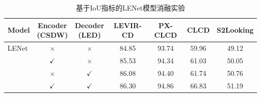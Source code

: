 \begin{table}[!htbp]
  \centering
  \caption{基于IoU指标的LENet模型消融实验}
  \label{tab:lenet_ablation}
  \begin{tabular}{lcccccc}
    \toprule
    Model & \makecell{Encoder\\(CSDW)} & \makecell{Decoder\\(LED)} & LEVIR-CD & PX-CLCD & CLCD  & S2Looking \\
    \midrule
    LENet               & $\times$      & $\times$      & 84.85    & 93.74   & 59.96 & 49.12     \\
                        & $\checkmark$  & $\times$      & 85.53    & 94.34   & 61.03 & 50.05     \\
                        & $\times$      & $\checkmark$  & 86.08    & 94.40   & 61.74 & 50.76     \\
                        & $\checkmark$  & $\checkmark$  & 86.30    & 94.86   & 66.83 & 51.19     \\
    \bottomrule
  \end{tabular}
\end{table}



